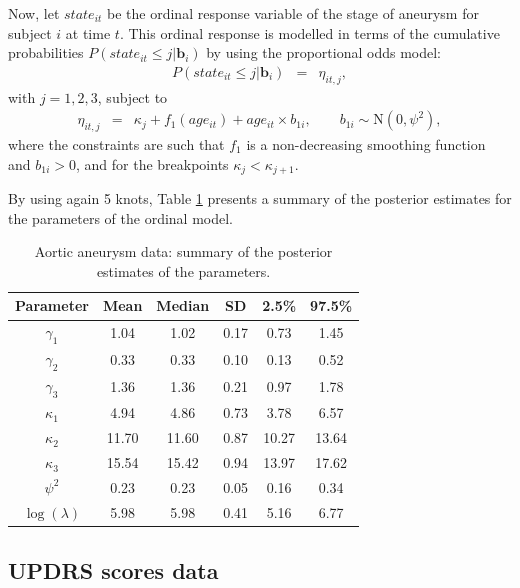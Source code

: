 \documentclass[11pt,letterpaper]{article}
\begin{document}
Now, let $state_{it}$ be the ordinal response  variable of the stage of aneurysm for subject $i$ at time $t$. This ordinal response is modelled in terms of the cumulative probabilities $P(state_{it} \leq j | \boldsymbol{b}_i)$ by using the proportional odds model:  
 \begin{eqnarray*}
 P(state_{it} \leq j | \boldsymbol{b}_i) &=& \eta_{it,j}, 
 \end{eqnarray*}
with $j=1,2,3$,  subject to 
\begin{eqnarray*}
\eta_{it,j} &=& \kappa_{j} + f_1(age_{it}) +age_{it} \times b_{1i} , 
\qquad 
b_{1i}\sim\mathrm{N}(0,\psi^2), 
\end{eqnarray*}
where the constraints are such that $f_1$ is a non-decreasing smoothing function and $b_{1i}>0$, and for the breakpoints $\kappa_{j}<\kappa_{j+1}$. 


By using again 5 knots, Table \ref{tab:aneur.3estimate} presents a summary of the posterior estimates for the parameters of the ordinal model.  

\begin{table}[!htb] 
\centering 
\caption{Aortic aneurysm data: summary of the posterior estimates of the parameters. }\label{tab:aneur.3estimate}  
\begin{tabular}{cccccc} 
\hline 
\textbf{Parameter} & \textbf{Mean} & \textbf{Median} & \textbf{SD} & \textbf{2.5\%} & \textbf{97.5\%} \\ 
\hline 
$\gamma_1$ & 
1.04 & 1.02 & 0.17 & 0.73 & 1.45 \\ 
$\gamma_2$ & 
0.33 & 0.33 & 0.10 & 0.13 & 0.52 \\ 
$\gamma_3$ & 
1.36 & 1.36 & 0.21 & 0.97 & 1.78 \\ 
$\kappa_1$ & 
4.94 & 4.86 & 0.73 & 3.78 & 6.57 \\ 
$\kappa_2$ & 
11.70 & 11.60 & 0.87 & 10.27 & 13.64 \\ 
$\kappa_3$ & 
15.54 & 15.42  & 0.94 & 13.97 & 17.62 \\ 
$\psi^2$ & 
0.23 & 0.23 & 0.05 & 0.16 & 0.34 \\ 
$\log(\lambda)$ & 
5.98 & 5.98  & 0.41 & 5.16 & 6.77 \\ 
\hline 
\end{tabular} 
\end{table} 





\subsection{UPDRS scores data}
\end{document}
